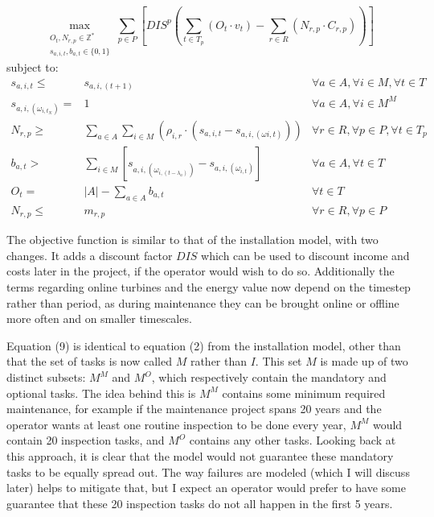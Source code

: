 \documentclass[a4paper,12pt]{article}
\begin{document}
\begin{equation}
	\max_{\substack{O_t, N_{r,p} \in \mathbb{Z}^* \\ 
	s_{a,i,t}, b_{a,t} \in \{0, 1\}}} 
	\sum_{p \in P} [ DIS^p (\sum_{t\in T_p} (O_t \cdot v_t)  - \sum_{r\in R} (N_{r,p} \cdot C_{r,p})) ]
\end{equation}
subject to:
\begin{align}
s_{a,i,t} \leq& s_{a,i,(t+1)}												&	\forall a \in A, \forall i \in M, \forall t \in T	\\
s_{a,i,(\omega_{i,t_N})} =& 1												&	\forall a \in A, \forall i \in M^M			\\		
N_{r,p} \geq& \sum_{a\in A} \sum_{i\in M} (\rho_{i,r} \cdot (s_{a,i,t} - s_{a,i,(\omega{i,t})})) 		& 	\forall r \in R, \forall p \in P, \forall t \in T_p 	\\
b_{a,t} >&  \sum_{i \in M} [s_{a,i,(\omega_{i,(t - \lambda_a)})} - s_{a,i,(\omega_{i,t})}]			&	\forall a \in A, \forall t \in T 			\\
O_t =&  |A| - \sum_{a \in A} b_{a,t}											&	\forall t \in T 						\\
N_{r,p} \leq& m_{r,p}													&	\forall r \in R, \forall p \in P
\end{align}

The objective function is similar to that of the installation model, with two changes. It adds a discount factor $DIS$ which can be used to discount income and costs later in the project, if the operator would wish to do so. Additionally the terms regarding online turbines and the energy value now depend on the timestep rather than period, as during maintenance they can be brought online or offline more often and on smaller timescales. 

Equation (9) is identical to equation (2) from the installation model, other than that the set of tasks is now called $M$ rather than $I$. This set $M$ is made up of two distinct subsets: $M^M$ and $M^O$, which respectively contain the mandatory and optional tasks. The idea behind this is $M^M$ contains some minimum required maintenance, for example if the maintenance project spans 20 years and the operator wants at least one routine inspection to be done every year, $M^M$ would contain 20 inspection tasks, and $M^O$ contains any other tasks. Looking back at this approach, it is clear that the model would not guarantee these mandatory tasks to be equally spread out. The way failures are modeled (which I will discuss later) helps to mitigate that, but I expect an operator would prefer to have some guarantee that these 20 inspection tasks do not all happen in the first 5 years. 
\end{document}

